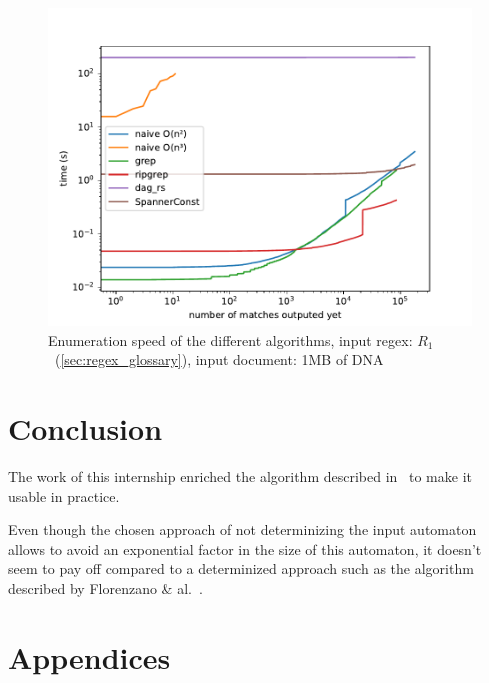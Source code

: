 \documentclass[12px]{article}
\theoremstyle{definition}
\begin{document}
      \begin{figure}%
        \label{fig:bench}
        \caption{
          Enumeration speed of the different algorithms, input regex:
          $R_1$~(\ref{sec:regex_glossary}), input document: 1MB of DNA
        }
        \center\includegraphics[width=5in]{figures/bench}
      \end{figure}



  \section{Conclusion}

    The work of this internship enriched the algorithm described
    in~\cite{ICDT19} to make it usable in practice.

    Even though the chosen approach of not determinizing the input automaton
    allows to avoid an exponential factor in the size of this automaton, it
    doesn't seem to pay off compared to a determinized approach such as the
    algorithm described by Florenzano \& al.~\cite{florenzano2018constant}.

  \pagebreak
  
  


  \pagebreak
  \section*{Appendices}
\end{document}
